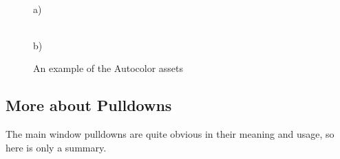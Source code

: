 \begin{figure}[htpb]
    \centering
    \begin{minipage}[h]{0.55\linewidth}
         \\ a)
    \end{minipage}
    \begin{minipage}[h]{0.4\linewidth}
         \\ b)
    \end{minipage}
    \caption{An example of the Autocolor assets}
    \label{fig:autocolor_assets_alpha}
\end{figure}


\subsection{More about Pulldowns}%
\label{sub:more_about_pulldowns}

The main window pulldowns are quite obvious in their meaning and usage, so here is only a summary.  


